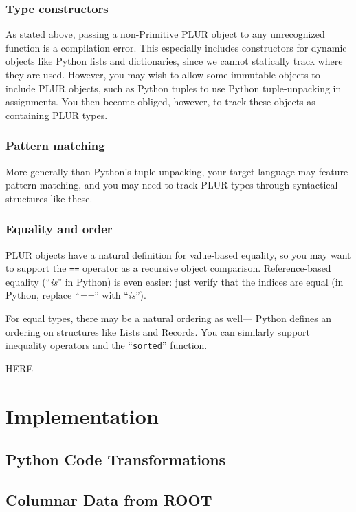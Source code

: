 \documentclass[10pt, conference, compsocconf]{IEEEtran}
\begin{document}
\subsubsection{Type constructors}

As stated above, passing a non-Primitive PLUR object to any unrecognized function is a compilation error. This especially includes constructors for dynamic objects like Python lists and dictionaries, since we cannot statically track where they are used. However, you may wish to allow some immutable objects to include PLUR objects, such as Python tuples to use Python tuple-unpacking in assignments. You then become obliged, however, to track these objects as containing PLUR types.

\subsubsection{Pattern matching}

More generally than Python's tuple-unpacking, your target language may feature pattern-matching, and you may need to track PLUR types through syntactical structures like these.

\subsubsection{Equality and order}

PLUR objects have a natural definition for value-based equality, so you may want to support the {\tt ==} operator as a recursive object comparison. Reference-based equality (``{\it is}'' in Python) is even easier: just verify that the indices are equal (in Python, replace ``{\it ==}'' with ``{\it is}'').

For equal types, there may be a natural ordering as well--- Python defines an ordering on structures like Lists and Records. You can similarly support inequality operators and the ``{\tt sorted}'' function.

HERE


\section{Implementation}

\subsection{Python Code Transformations}

\subsection{Columnar Data from ROOT}
\end{document}

